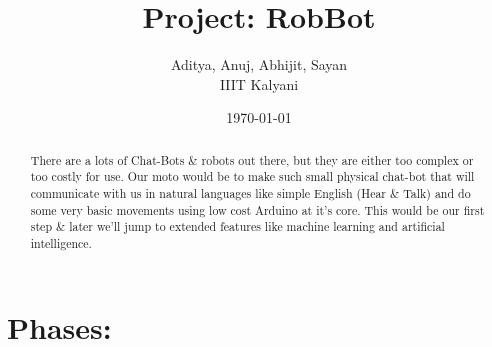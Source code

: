 \documentclass{article}
\begin{document}
	\title{Project: RobBot}
	\author{Aditya, Anuj, Abhijit, Sayan\\IIIT Kalyani\\}
	\date{\today}
	\maketitle
	\begin{abstract}
	There are a lots of Chat-Bots \& robots out there, but they are either too complex or too costly for use. Our moto would be to make such small physical chat-bot that will communicate with us in natural languages like simple English (Hear \& Talk) and do some very basic movements using low cost Arduino at it's core. This would be our first step \& later we'll jump to extended features like machine learning and artificial intelligence.
	\end{abstract}
	\section{Phases:}
\end{document}
